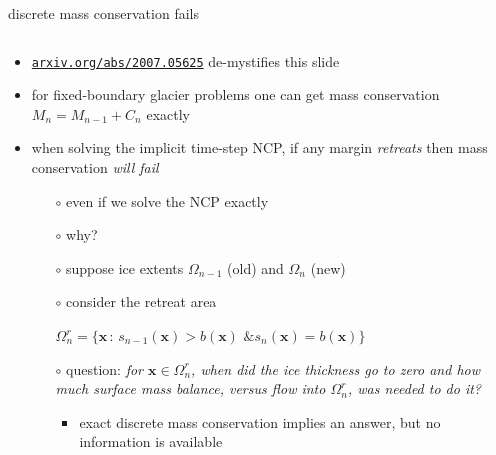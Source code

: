\documentclass[10pt,hyperref,dvipsnames]{beamer}
\newcommand{\bx}{\mathbf{x}}
\begin{document}
\begin{frame}{discrete mass conservation fails}

\begin{columns}
\begin{column}{0.7\textwidth}
\begin{itemize}
\item \small \href{https://arxiv.org/abs/2007.05625}{\texttt{arxiv.org/abs/2007.05625}} de-mystifies this slide \normalsize
\item for fixed-boundary glacier problems one can get mass conservation $M_n = M_{n-1} + C_n$ exactly
\item when solving the implicit time-step NCP, if any margin \emph{retreats} then mass conservation \emph{will fail}
    \begin{itemize}
    \item[$\circ$] even if we solve the NCP exactly
    \item[$\circ$] why?
    \item[$\circ$] suppose ice extents $\Omega_{n-1}$ (old) and $\Omega_n$ (new)
    \item[$\circ$] consider the retreat area
    
    $\Omega_n^r = \{\bx\,:\, s_{n-1}(\bx)>b(\bx) \text{ \& } s_{n}(\bx)=b(\bx)\}$

    \medskip
    \item[$\circ$] question: \emph{for $\bx \in \Omega_n^r$, when did the ice thickness go to zero and how much surface mass balance, versus flow into $\Omega_n^r$, was needed to do it?}
        \begin{itemize}
        \item exact discrete mass conservation implies an answer, but no information is available
        \end{itemize}
    \end{itemize}


\end{itemize}
\end{column}
\end{columns}
\end{frame}
\end{document}
